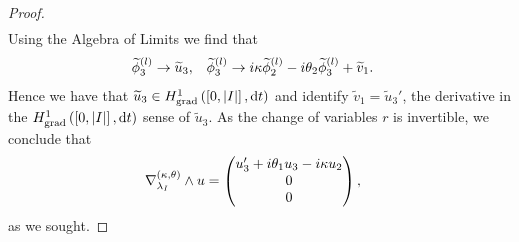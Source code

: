 \begin{proof}
\begin{align*}
	\end{align*}
	Using the Algebra of Limits we find that
	\begin{align*}
		\widetilde{\phi}^{(l)}_3 \rightarrow \widetilde{u}_3, 
		&\quad \widetilde{\phi}^{(l)}_3 \rightarrow i\kappa\widetilde{\phi}^{(l)}_2 - i\theta_2\widetilde{\phi}^{(l)}_3 + \widetilde{v}_1.
	\end{align*}
	Hence we have that $\widetilde{u}_3\in H^1_\mathrm{grad}\left( \left[ 0,\left\lvert I \right\rvert \right], \mathrm{d}t \right)$ and identify $\widetilde{v}_1 = \widetilde{u}_3'$, the derivative in the $H^1_\mathrm{grad}\left( \left[ 0,\left\lvert I \right\rvert \right], \mathrm{d}t \right)$ sense of $\widetilde{u}_3$.
	As the change of variables $r$ is invertible, we conclude that
	\begin{align*}
		\nabla_{\lambda_I}^{\left( \kappa, \theta \right)}\wedge u &= 
		\begin{pmatrix} u_3' + i\theta_1 u_3 - i\kappa u_2 \\ 0 \\ 0 \end{pmatrix},
	\end{align*}
	as we sought.
\end{proof}

